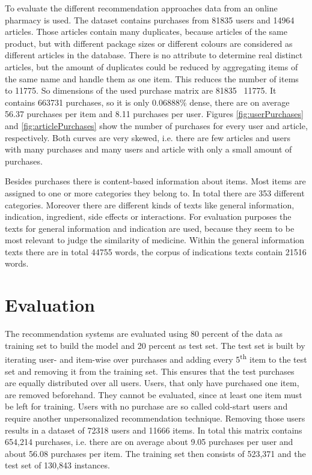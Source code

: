 \documentclass[10pt]{reportMaster}
\begin{document}
To evaluate the different recommendation approaches data from an online pharmacy is used.
The dataset contains purchases from 81835 users and 14964 articles.
Those articles contain many duplicates, because articles of the same product, but with different package sizes or different colours are considered as different articles in the database.
There is no attribute to determine real distinct articles, but the amount of duplicates could be reduced by aggregating items of the same name and handle them as one item.
This reduces the number of items to 11775.
So dimensions of the used purchase matrix are 81835 \texttimes \ 11775.
It contains 663731 purchases, so it is only 0.06888\% dense, there are on average 56.37 purchases per item and 8.11 purchases per user. %
Figures \ref{fig:userPurchases} and \ref{fig:articlePurchases} show the number of purchases for every user and article, respectively.
Both curves are very skewed, i.e. there are few articles and users with many purchases and many users and article with only a small amount of purchases.


Besides purchases there is content-based information about items.
Most items are assigned to one or more categories they belong to.
In total there are 353 different categories.
Moreover there are different kinds of texts like general information, indication, ingredient, side effects or interactions.
For evaluation purposes the texts for general information and indication are used, because they seem to be most relevant to judge the similarity of medicine.
Within the general information texts there are in total 44755 words, the corpus of indications texts contain 21516 words. %



 \section{Evaluation}
\label{sec:eval}
The recommendation systems are evaluated using 80 percent of the data as training set to build the model and 20 percent as test set.
The test set is built by iterating user- and item-wise over purchases and adding every 5\textsuperscript{th} item to the test set and removing it from the training set.
This ensures that the test purchases are equally distributed over all users.
Users, that only have purchased one item, are removed beforehand.
They cannot be evaluated, since at least one item must be left for training.
Users with no purchase are so called cold-start users and require another unpersonalized recommendation technique.
Removing those users results in a dataset of 72318 users and 11666 items.
In total this matrix contains 654,214 purchases, i.e. there are on average about 9.05 purchases per user and about 56.08 purchases per item.
The training set then consists of 523,371 and the test set of 130,843 instances.
\end{document}
